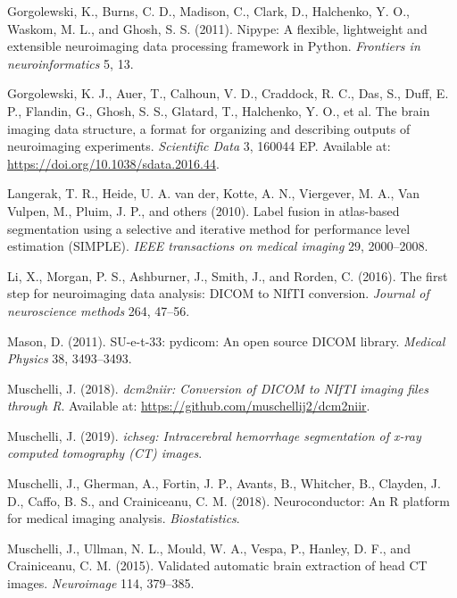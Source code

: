 \documentclass[utf8]{frontiersSCNS}
\begin{document}
\leavevmode\hypertarget{ref-nipype}{}%
Gorgolewski, K., Burns, C. D., Madison, C., Clark, D., Halchenko, Y. O., Waskom, M. L., and Ghosh, S. S. (2011). Nipype: A flexible, lightweight and extensible neuroimaging data processing framework in Python. \emph{Frontiers in neuroinformatics} 5, 13.

\leavevmode\hypertarget{ref-bids}{}%
Gorgolewski, K. J., Auer, T., Calhoun, V. D., Craddock, R. C., Das, S., Duff, E. P., Flandin, G., Ghosh, S. S., Glatard, T., Halchenko, Y. O., et al. The brain imaging data structure, a format for organizing and describing outputs of neuroimaging experiments. \emph{Scientific Data} 3, 160044 EP. Available at: \url{https://doi.org/10.1038/sdata.2016.44}.

\leavevmode\hypertarget{ref-langerak2010label}{}%
Langerak, T. R., Heide, U. A. van der, Kotte, A. N., Viergever, M. A., Van Vulpen, M., Pluim, J. P., and others (2010). Label fusion in atlas-based segmentation using a selective and iterative method for performance level estimation (SIMPLE). \emph{IEEE transactions on medical imaging} 29, 2000--2008.

\leavevmode\hypertarget{ref-dcm2niix}{}%
Li, X., Morgan, P. S., Ashburner, J., Smith, J., and Rorden, C. (2016). The first step for neuroimaging data analysis: DICOM to NIfTI conversion. \emph{Journal of neuroscience methods} 264, 47--56.

\leavevmode\hypertarget{ref-pydicom}{}%
Mason, D. (2011). SU-e-t-33: pydicom: An open source DICOM library. \emph{Medical Physics} 38, 3493--3493.

\leavevmode\hypertarget{ref-dcm2niir}{}%
Muschelli, J. (2018). \emph{dcm2niir: Conversion of DICOM to NIfTI imaging files through R}. Available at: \url{https://github.com/muschellij2/dcm2niir}.

\leavevmode\hypertarget{ref-ichseg}{}%
Muschelli, J. (2019). \emph{ichseg: Intracerebral hemorrhage segmentation of x-ray computed tomography (CT) images}.

\leavevmode\hypertarget{ref-neuroconductor}{}%
Muschelli, J., Gherman, A., Fortin, J. P., Avants, B., Whitcher, B., Clayden, J. D., Caffo, B. S., and Crainiceanu, C. M. (2018). Neuroconductor: An R platform for medical imaging analysis. \emph{Biostatistics}.

\leavevmode\hypertarget{ref-ctbet}{}%
Muschelli, J., Ullman, N. L., Mould, W. A., Vespa, P., Hanley, D. F., and Crainiceanu, C. M. (2015). Validated automatic brain extraction of head CT images. \emph{Neuroimage} 114, 379--385.
\end{document}
